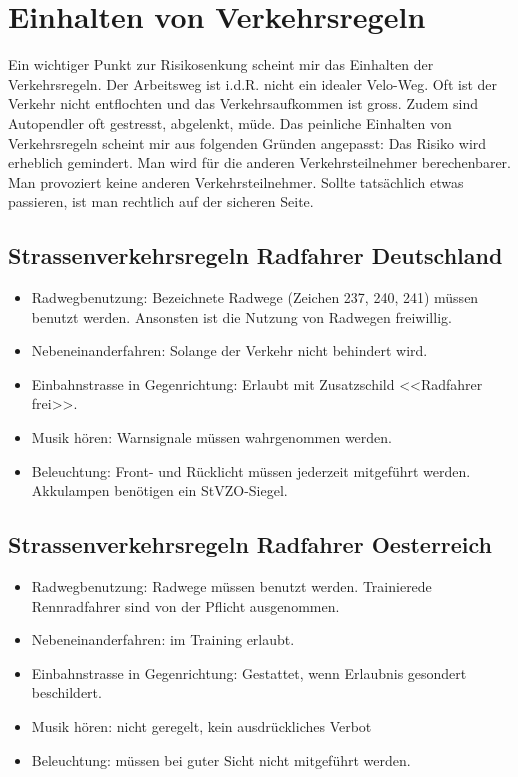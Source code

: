 \section{Einhalten von Verkehrsregeln}
Ein wichtiger Punkt zur Risikosenkung scheint mir das Einhalten der Verkehrsregeln. Der Arbeitsweg ist i.d.R. nicht ein idealer Velo-Weg. Oft ist der Verkehr nicht entflochten und das Verkehrsaufkommen ist gross. Zudem sind Autopendler oft gestresst, abgelenkt, müde.  Das peinliche Einhalten von Verkehrsregeln scheint mir aus folgenden Gründen angepasst:
Das Risiko wird erheblich gemindert. Man wird für die anderen Verkehrsteilnehmer berechenbarer.
Man provoziert keine anderen Verkehrsteilnehmer.
Sollte tatsächlich etwas passieren, ist man rechtlich auf der sicheren Seite.
\cite{Flieshardt2015}

\subsection{Strassenverkehrsregeln Radfahrer Deutschland}
\begin{itemize}
        \item Radwegbenutzung: Bezeichnete Radwege (Zeichen 237, 240, 241) müssen benutzt werden. Ansonsten ist die Nutzung von Radwegen freiwillig.
        \item Nebeneinanderfahren: Solange der Verkehr nicht behindert wird. 
        \item Einbahnstrasse in Gegenrichtung: Erlaubt mit Zusatzschild <<Radfahrer frei>>.
        \item Musik hören: Warnsignale müssen wahrgenommen werden.
        \item Beleuchtung: Front- und Rücklicht müssen jederzeit mitgeführt werden. Akkulampen benötigen ein StVZO-Siegel.
\end{itemize}

\subsection{Strassenverkehrsregeln Radfahrer Oesterreich}
\begin{itemize}
        \item Radwegbenutzung: Radwege müssen benutzt werden. Trainierede Rennradfahrer sind von der Pflicht ausgenommen.
        \item Nebeneinanderfahren: im Training erlaubt. 
        \item Einbahnstrasse in Gegenrichtung: Gestattet, wenn Erlaubnis gesondert beschildert.
        \item Musik hören: nicht geregelt, kein ausdrückliches Verbot
        \item Beleuchtung: müssen bei guter Sicht nicht mitgeführt werden.
\end{itemize}

